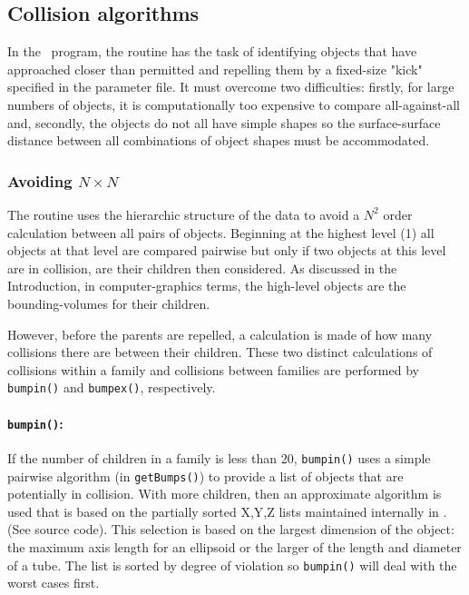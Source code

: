 \subsection{Collision algorithms}

In the \NAME\ program, the
 routine has the task of identifying objects that have approached closer
than permitted and repelling them by a fixed-size "kick" specified in the parameter file.
It must overcome two difficulties:  firstly, for large numbers of objects, it is
computationally too expensive to compare all-against-all and, secondly, the objects do not
all have simple shapes so the surface-surface distance between all combinations of
object shapes must be accommodated.

\subsubsection{Avoiding $N \times N$}

The  routine uses the hierarchic structure of the data to avoid a $N^2$
order calculation between all pairs of objects.  Beginning at the highest level (1)
all objects at that level are compared pairwise but only if two objects at this level
are in collision, are their children then considered. 
As discussed in the Introduction, in computer-graphics terms,
the high-level objects are the bounding-volumes for their children. 

However, before the parents are repelled, a calculation is made of how many collisions
there are between their children.  These two distinct calculations of collisions
within a family and collisions between families are performed by {\tt bumpin()}
and {\tt bumpex()}, respectively.

\paragraph{{\tt \bfseries bumpin()}:\\}

If the number of children in a family is less than 20, {\tt bumpin()}
uses a simple pairwise algorithm (in {\tt getBumps()}) to provide a list of objects that
are potentially in collision.  With more children, then an approximate algorithm
is used that is based on the partially sorted X,Y,Z lists maintained internally in \NAME . (See
source code).  This selection is based on the largest dimension of the object:  the maximum
axis length for an ellipsoid or the larger of the length and diameter of a tube.  The list
is sorted by degree of violation so {\tt bumpin()} will deal with the worst cases first.

